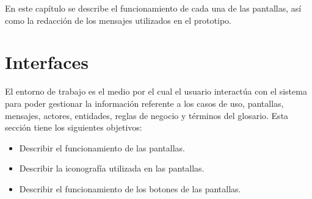 En este capítulo se describe el funcionamiento de cada una de las pantallas, así como la redacción de los mensajes utilizados en el prototipo.



\section{Interfaces}

    El entorno de trabajo es el medio por el cual el usuario interactúa con el sistema para poder gestionar la información 
    referente a los casos de uso, pantallas, mensajes, actores, entidades, reglas de negocio y términos del glosario. Esta sección tiene los siguientes objetivos: \bigskip

    \begin{itemize}
      \item Describir el funcionamiento de las pantallas.
      \item Describir la iconografía utilizada en las pantallas.
      \item Describir el funcionamiento de los botones de las pantallas.
    \end{itemize}